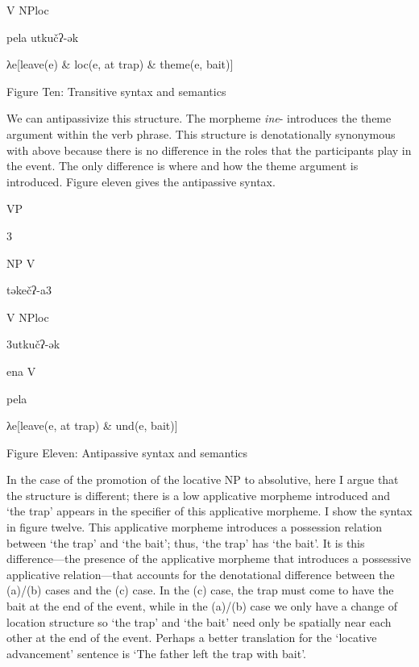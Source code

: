 \documentclass[output=paper,modfonts,nonflat]{langsci/langscibook}
\begin{document}
      V             NPloc

    pela           utkučʔ-ək

    λe[leave(e) \& loc(e, at trap) \& theme(e, bait)]

\begin{stylecaption}
Figure Ten: Transitive syntax and semantics
\end{stylecaption}

We can antipassivize this structure.  The morpheme \textit{ine}{}- introduces the theme argument within the verb phrase.  This structure is denotationally synonymous with  above because there is no difference in the roles that the participants play in the event.  The only difference is where and how the theme argument is introduced.  Figure eleven gives the antipassive syntax.

               VP

      3

     NP            V

təkečʔ-a3

   V    NPloc

        3utkučʔ-ək

      ena           V

            pela

\begin{styleListParagraph}
λe[leave(e, at trap) \& und(e, bait)]
\end{styleListParagraph}

\begin{stylecaption}
Figure Eleven: Antipassive syntax and semantics
\end{stylecaption}

In the case of the promotion of the locative NP to absolutive, here I argue that the structure is different; there is a low applicative morpheme introduced and ‘the trap’ appears in the specifier of this applicative morpheme.  I show the syntax in figure twelve.  This applicative morpheme introduces a possession relation between ‘the trap’ and ‘the bait’; thus, ‘the trap’ has ‘the bait’.  It is this difference—the presence of the applicative morpheme that introduces a possessive applicative relation—that accounts for the denotational difference between the (a)/(b) cases and the (c) case. In the (c) case, the trap must come to have the bait at the end of the event, while in the (a)/(b) case we only have a change of location structure so ‘the trap’ and ‘the bait’ need only be spatially near each other at the end of the event.  Perhaps a better translation for the ‘locative advancement’ sentence is ‘The father left the trap with bait’.
\end{document}
